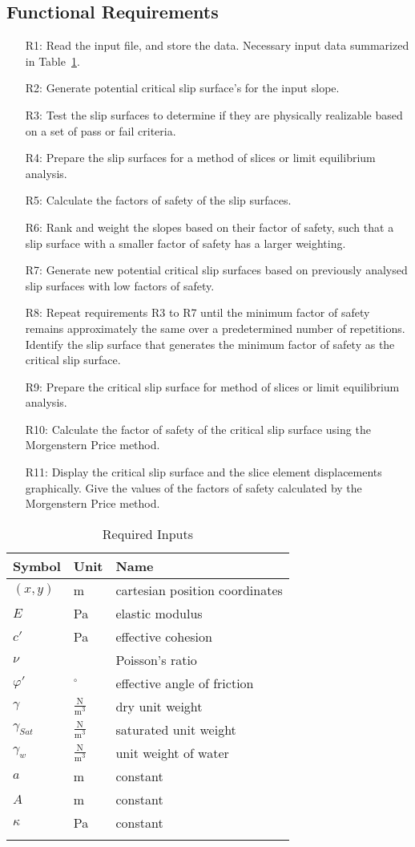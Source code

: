 \documentclass[12pt]{article}
\begin{document}
\subsection{Functional Requirements}
\label{Sec:FRs}
\begin{itemize}
\item[R1:]Read the input file, and store the data. Necessary input data summarized in Table~\ref{Table:inDataTable}.
\item[R2:]Generate potential critical slip surface's for the input slope.
\item[R3:]Test the slip surfaces to determine if they are physically realizable based on a set of pass or fail criteria.
\item[R4:]Prepare the slip surfaces for a method of slices or limit equilibrium analysis.
\item[R5:]Calculate the factors of safety of the slip surfaces.
\item[R6:]Rank and weight the slopes based on their factor of safety, such that a slip surface with a smaller factor of safety has a larger weighting.
\item[R7:]Generate new potential critical slip surfaces based on previously analysed slip surfaces with low factors of safety.
\item[R8:]Repeat requirements R3 to R7 until the minimum factor of safety remains approximately the same over a predetermined number of repetitions. Identify the slip surface that generates the minimum factor of safety as the critical slip surface.
\item[R9:]Prepare the critical slip surface for method of slices or limit equilibrium analysis.
\item[R10:]Calculate the factor of safety of the critical slip surface using the Morgenstern Price method.
\item[R11:]Display the critical slip surface and the slice element displacements graphically. Give the values of the factors of safety calculated by the Morgenstern Price method.
\end{itemize}
\begin{longtable}{l l l}
\toprule
Symbol & Unit & Name
\\
\midrule
$(x,y)$ & m & cartesian position coordinates
\\
$E$ & Pa & elastic modulus
\\
$c'$ & Pa & effective cohesion
\\
$ν$ &  & Poisson's ratio
\\
$φ'$ & ${}^{\circ}$ & effective angle of friction
\\
$γ$ & $\frac{\text{N}}{\text{m}^{3}}$ & dry unit weight
\\
${γ_{Sat}}$ & $\frac{\text{N}}{\text{m}^{3}}$ & saturated unit weight
\\
${γ_{w}}$ & $\frac{\text{N}}{\text{m}^{3}}$ & unit weight of water
\\
$a$ & m & constant
\\
$A$ & m & constant
\\
$κ$ & Pa & constant
\\
\bottomrule
\caption{Required Inputs}
\label{Table:inDataTable}
\end{longtable}
\end{document}
